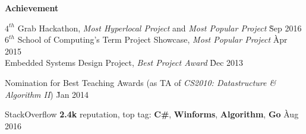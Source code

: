 \documentclass{article}
\begin{document}
\centerline {\Large \bf Achievement}

\medskip

\begin{tabbing}
\hspace{12pt} \textbullet \hspace{3pt} {$4^{th}$} Grab Hackathon, {\it Most Hyperlocal Project} and {\it Most Popular Project} \` Sep 2016 \\
\hspace{12pt} \textbullet \hspace{3pt} {$6^{th}$} School of Computing's Term Project Showcase, {\it Most Popular Project} \` Apr 2015 \\
\hspace{12pt} \textbullet \hspace{3pt} Embedded Systems Design Project, {\it Best Project Award} \` Dec 2013 \\
\end{tabbing}\vspace{-18pt}

\begin{tabbing}
\hspace{12pt} \textbullet \hspace{3pt} Nomination for Best Teaching Awards (as TA of {\it CS2010: Datastructure \& Algorithm II}) \` Jan 2014 \\
\end{tabbing}\vspace{-18pt}

\begin{tabbing}
\hspace{12pt} \textbullet \hspace{3pt} StackOverflow {\bf 2.4k} reputation, top tag: {\bf C\#}, {\bf Winforms}, {\bf Algorithm}, {\bf Go} \` Aug 2016 \\
\end{tabbing}\vspace{-18pt}
\end{document}
